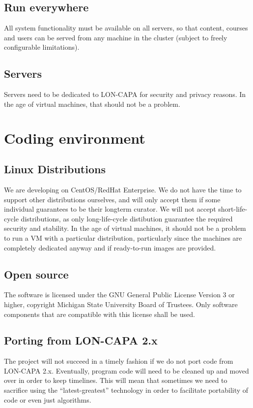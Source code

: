 \subsection{Run everywhere}
All system functionality must be available on all servers, so that content, courses and users can be served from any machine in the cluster (subject to freely configurable limitations).
\subsection{Servers}
Servers need to be dedicated to LON-CAPA for security and privacy reasons. In the age of virtual machines, that should not be a problem.
\section{Coding environment}
\subsection{Linux Distributions}
We are developing on CentOS/RedHat Enterprise. We do not have the time to support other distributions ourselves, and will only accept them if some individual guarantees to be their longterm curator. We will not accept short-life-cycle distributions, as only long-life-cycle distibution guarantee the required security and stability. In the age of virtual machines, it should not be a problem to run a VM with a particular distribution, particularly since the machines are completely dedicated anyway and if ready-to-run images are provided.
\subsection{Open source}
The software is licensed under the GNU General Public License Version 3 or higher, copyright Michigan State University Board of Trustees. Only software components that are compatible with this license shall be used.
\subsection{Porting from LON-CAPA 2.x}
The project will not succeed in a timely fashion if we do not port code from LON-CAPA 2.x. Eventually, program code will need to be cleaned up and moved over in order to keep timelines. This will mean that sometimes we need to sacrifice using the ``latest-greatest'' technology in order to facilitate portability of code or even just algorithms. 
